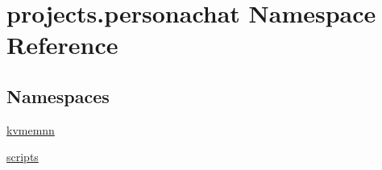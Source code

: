 \hypertarget{namespaceprojects_1_1personachat}{}\section{projects.\+personachat Namespace Reference}
\label{namespaceprojects_1_1personachat}
\subsection*{Namespaces}
\begin{DoxyCompactItemize}
\item 
 \hyperlink{namespaceprojects_1_1personachat_1_1kvmemnn}{kvmemnn}
\item 
 \hyperlink{namespaceprojects_1_1personachat_1_1scripts}{scripts}
\end{DoxyCompactItemize}
